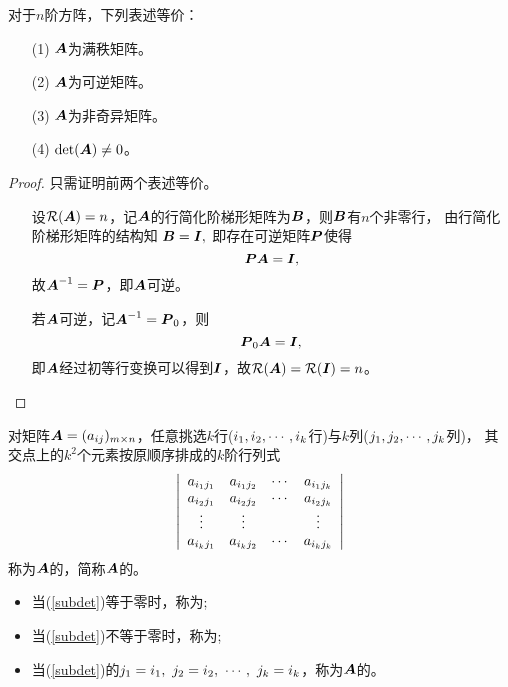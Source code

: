 \begin{frame}
\begin{dingli}
  对于$n$阶方阵，下列表述等价：
  \begin{itemize}
  \item[(1)] $\boldsymbol{A}$为满秩矩阵。
  \item[(2)] $\boldsymbol{A}$为可逆矩阵。
  \item[(3)] $\boldsymbol{A}$为非奇异矩阵。
  \item[(4)] $\mathrm{det}(\boldsymbol{A})\ne 0$。
  \end{itemize}
\end{dingli} \pause 
\begin{proof}
只需证明前两个表述等价。 
\begin{itemize}
\item [\red{(1)$\Rightarrow$(2)}]    
  设$\mathcal{R}(\boldsymbol{A})=n$，记$\boldsymbol{A}$的行简化阶梯形矩阵为$\boldsymbol{B}$，则$\boldsymbol{B}$有$n$个非零行， 由行简化阶梯形矩阵的结构知
  $
  \boldsymbol{B}=\boldsymbol{I},
  $ 
  即存在可逆矩阵$\boldsymbol{P}$使得
  $$
  \boldsymbol{P}\boldsymbol{A}=\boldsymbol{I},
  $$
  故$\boldsymbol{A}^{-1}=\boldsymbol{P}$，即$\boldsymbol{A}$可逆。 \pause 
\item [\red{(2)$\Rightarrow$(1)}]   
  若$\boldsymbol{A}$可逆，记$\boldsymbol{A}^{-1}=\boldsymbol{P}_0$，则
  $$
  \boldsymbol{P}_0\boldsymbol{A}=\boldsymbol{I},
  $$ 
  即$\boldsymbol{A}$经过初等行变换可以得到$\boldsymbol{I}$，故$\mathcal{R}(\boldsymbol{A})=\mathcal{R}(\boldsymbol{I})=n$。
\end{itemize}
\end{proof}
\end{frame}

\begin{frame}
\begin{dingyi}[子式与主子式]
  对矩阵$\boldsymbol{A}=(a_{ij})_{m\times n}$，任意挑选$k$行($i_1,i_2,\cdots,i_k$行)与$k$列($j_1,j_2,\cdots,j_k$列)，
  其交点上的$k^2$个元素按原顺序排成的$k$阶行列式
  \begin{equation}\label{subdet}
    \left|
      \begin{array}{cccc}
        a_{i_1j_1} & a_{i_1j_2} & \cdots & a_{i_1j_k}\\
        a_{i_2j_1} & a_{i_2j_2} & \cdots & a_{i_2j_k}\\
        \vdots & \vdots && \vdots\\
        a_{i_kj_1} & a_{i_kj_2} & \cdots & a_{i_kj_k}\\
      \end{array}
    \right|
  \end{equation}
  称为$\boldsymbol{A}$的，简称$\boldsymbol{A}$的。 
  \begin{itemize}
  \item 当(\ref{subdet})等于零时，称为;
  \item 当(\ref{subdet})不等于零时，称为;
  \item 当(\ref{subdet})的$j_1=i_1,~j_2=i_2,~\cdots,~j_k=i_k$，称为$\boldsymbol{A}$的。
  \end{itemize}
\end{dingyi}
\end{frame}

